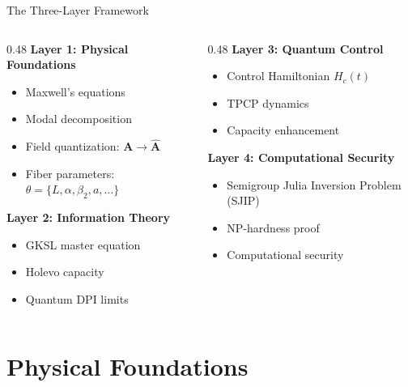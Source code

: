 \documentclass[aspectratio=169,12pt]{beamer}
\begin{document}
\begin{frame}{The Three-Layer Framework}
\begin{columns}
\begin{column}{0.48\textwidth}
\textbf{Layer 1: Physical Foundations}
\begin{itemize}
\item Maxwell's equations
\item Modal decomposition
\item Field quantization: $\mathbf{A} \to \hat{\mathbf{A}}$
\item Fiber parameters: $\theta = \{L, \alpha, \beta_2, a, \ldots\}$
\end{itemize}

\vspace{0.3cm}

\textbf{Layer 2: Information Theory}
\begin{itemize}
\item GKSL master equation
\item Holevo capacity
\item Quantum DPI limits
\end{itemize}
\end{column}

\begin{column}{0.48\textwidth}
\textbf{Layer 3: Quantum Control}
\begin{itemize}
\item Control Hamiltonian $H_c(t)$
\item TPCP dynamics
\item Capacity enhancement
\end{itemize}

\vspace{0.3cm}

\textbf{Layer 4: Computational Security}
\begin{itemize}
\item Semigroup Julia Inversion Problem (SJIP)
\item NP-hardness proof
\item Computational security
\end{itemize}
\end{column}
\end{columns}
\end{frame}

\section{Physical Foundations}
\end{document}
